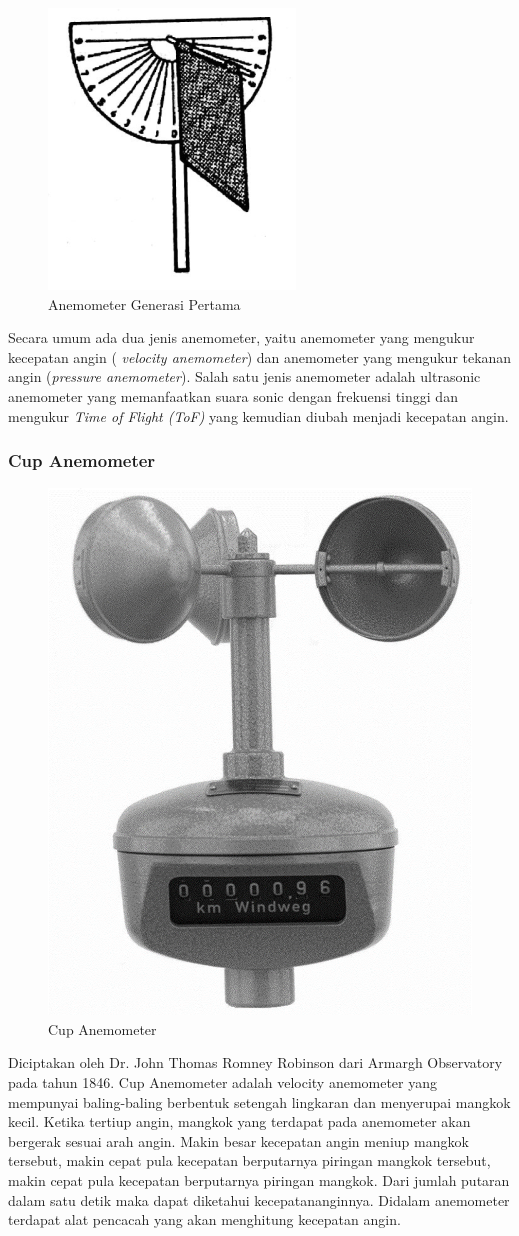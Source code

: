\begin{figure}[h!]
	\centering
	\includegraphics{gambar/anemometerGen1}
	\caption{Anemometer Generasi Pertama \parencite{Panjaitan2018}}
	\label{fig:anemometergen1}
\end{figure}

Secara umum ada dua jenis anemometer, yaitu anemometer yang mengukur kecepatan angin (\textit{
velocity anemometer}) dan anemometer yang mengukur tekanan angin (\textit{pressure anemometer}).
Salah satu jenis anemometer adalah ultrasonic anemometer yang memanfaatkan suara sonic dengan frekuensi tinggi dan mengukur \textit{Time of Flight (ToF)} yang kemudian diubah menjadi kecepatan angin.

\subsubsection{Cup Anemometer}

\begin{figure}[h!]
	\centering
	\includegraphics[width=0.3\linewidth]{gambar/anemometerCup}
	\caption{Cup Anemometer \parencite{figCupAnemometer}}
	\label{fig:anemometercup}
\end{figure}

Diciptakan oleh Dr. John Thomas Romney Robinson dari Armargh Observatory pada tahun 1846.
Cup Anemometer adalah velocity anemometer yang mempunyai baling-baling berbentuk setengah lingkaran dan menyerupai mangkok kecil. Ketika tertiup angin, mangkok 
yang terdapat pada anemometer akan bergerak sesuai arah angin. Makin besar kecepatan angin meniup mangkok tersebut, makin cepat pula kecepatan 
berputarnya piringan mangkok tersebut, makin cepat pula kecepatan berputarnya piringan mangkok. Dari jumlah putaran dalam satu detik maka dapat 
diketahui kecepatananginnya. Didalam anemometer terdapat alat pencacah yang akan menghitung kecepatan angin.

